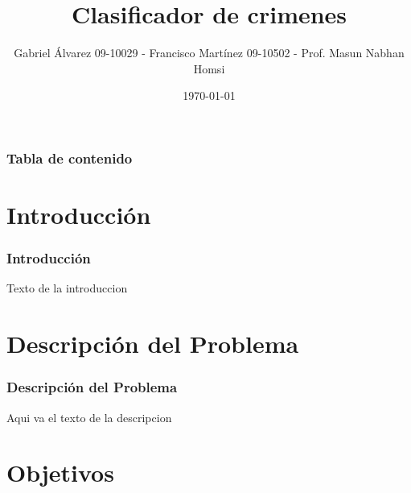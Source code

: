 \documentclass{beamer}
\title[Proyecto Final]{Clasificador de crimenes} %
\author{Gabriel \'{A}lvarez 09-10029 - Francisco Mart\'{i}nez 09-10502 - Prof. Masun Nabhan Homsi} %
\institute[USB] %
{
Universidad Sim\'{o}n Bol\'{i}var \\ %
\medskip
\textit{gabrielaar11@gmail.com - frammnm@gmail.com - mnabhan@usb.ve} %
}
\date{\today} %
\begin{document}
    

\begin{frame}
\titlepage %
\end{frame}

\begin{frame}[allowframebreaks=0.95]
\frametitle{Tabla de contenido} %
\tableofcontents %
\end{frame}


\section{Introducci\'{o}n} %
\begin{frame}
\frametitle{Introducci\'{o}n}
Texto de la introduccion
\end{frame}
\section{Descripci\'{o}n del Problema} 
\begin{frame}
\frametitle{Descripci\'{o}n del Problema}
Aqui va el texto de la descripcion
\end{frame}
\section{Objetivos} 
\end{document}
